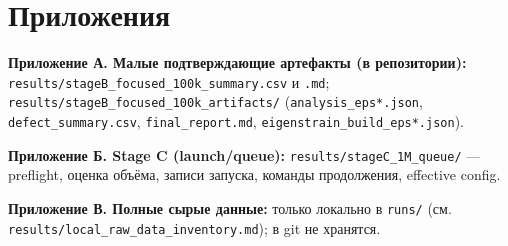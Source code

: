 \documentclass[14pt,a4paper]{extarticle}
\newcommand{\code}[1]{\texttt{#1}}
\begin{document}
\section{Приложения}
\textbf{Приложение А. Малые подтверждающие артефакты (в репозитории):} \code{results/stageB\_focused\_100k\_summary.csv} и \code{.md}; \code{results/stageB\_focused\_100k\_artifacts/} (\code{analysis\_eps*.json}, \code{defect\_summary.csv}, \code{final\_report.md}, \code{eigenstrain\_build\_eps*.json}).

\textbf{Приложение Б. Stage C (launch/queue):} \code{results/stageC\_1M\_queue/} — preflight, оценка объёма, записи запуска, команды продолжения, effective config.

\textbf{Приложение В. Полные сырые данные:} только локально в \code{runs/} (см. \code{results/local\_raw\_data\_inventory.md}); в git не хранятся.
\end{document}

